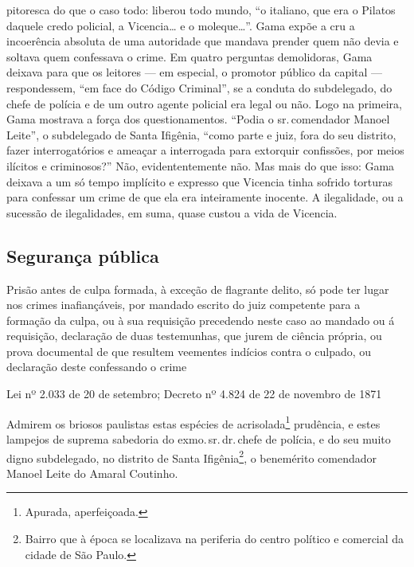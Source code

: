 \begin{didascalia}
{pitoresca do que o caso todo: liberou todo mundo, ``o italiano, que era o
Pilatos daquele credo policial, a Vicencia\ldots{} e o moleque\ldots{}''. Gama
expõe a cru a incoerência absoluta de uma autoridade que mandava prender
quem não devia e soltava quem confessava o crime. Em quatro perguntas
demolidoras, Gama deixava para que os leitores --- em especial, o
promotor público da capital --- respondessem, ``em face do Código
Criminal'', se a conduta do subdelegado, do chefe de polícia e de um
outro agente policial era legal ou não. Logo na primeira, Gama mostrava
a força dos questionamentos. ``Podia o sr.\,comendador Manoel Leite'', o
subdelegado de Santa Ifigênia, ``como parte e juiz, fora do seu distrito,
fazer interrogatórios e ameaçar a interrogada para extorquir confissões,
por meios ilícitos e criminosos?'' Não, evidententemente não. Mas mais do
que isso: Gama deixava a um só tempo implícito e expresso que Vicencia
tinha sofrido torturas para confessar um crime de que ela era
inteiramente inocente. A ilegalidade, ou a sucessão de ilegalidades, em
suma, quase custou a vida de Vicencia.}
\end{didascalia}

\subsection{Segurança pública}

\epigraph{Prisão antes de culpa formada, à exceção de flagrante delito, só
pode ter lugar nos crimes inafiançáveis, por mandado escrito do juiz
competente para a formação da culpa, ou à sua requisição precedendo
neste caso ao mandado ou á requisição, declaração de duas testemunhas,
que jurem de ciência própria, ou prova documental de que resultem
veementes indícios contra o culpado, ou declaração deste confessando o
crime}{Lei nº 2.033 de 20 de setembro; Decreto nº 4.824 de 22 de
novembro de 1871\footnotemark}


Admirem os briosos paulistas estas espécies de acrisolada\footnote{
  Apurada, aperfeiçoada.} prudência, e estes lampejos de suprema
sabedoria do exmo.\,sr.\,dr.\,chefe de polícia, e do seu muito digno
subdelegado, no distrito de Santa Ifigênia\footnote{ Bairro que à época
  se localizava na periferia do centro político e comercial da cidade de
  São Paulo.}, o benemérito comendador Manoel Leite do Amaral Coutinho.

